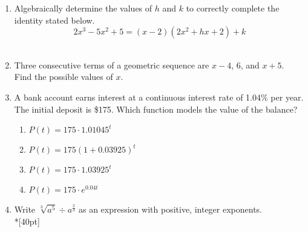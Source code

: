 \documentclass[12pt, oneside]{article}
\begin{document}
\begin{enumerate}
\newpage
\item Algebraically determine the values of $h$ and $k$ to correctly complete the identity stated below.
\[2x^3-5x^2+5=(x-2)(2x^2+hx+2)+k\] \\[2in]
        \begin{flushright}[4]\end{flushright}

\item Three consecutive terms of a geometric sequence are $x-4$, 6, and $x+5$.\\
Find the possible values of $x$.\\[3in]
    \begin{flushright}[6]\end{flushright}

\newpage
\item A bank account earns interest at a continuous interest rate of 1.04\% per year. The initial deposit is \$175. Which function models the value of the balance? \qquad [2]
\begin{enumerate}
    \item $P(t)=175 \cdot 1.01045^{t}$
    \item $P(t)=175 (1+0.03925)^{t}$
    \item $P(t)=175 \cdot 1.03925^{t}$
    \item $P(t)=175 \cdot e^{0.04t}$
\end{enumerate}


\item Write $\sqrt[3]{a^5} \div a^{\frac{2}{3}}$ as an expression with positive, integer exponents.\\*[40pt]
    \begin{flushright}[3]\end{flushright}


\end{enumerate}
\end{document}
